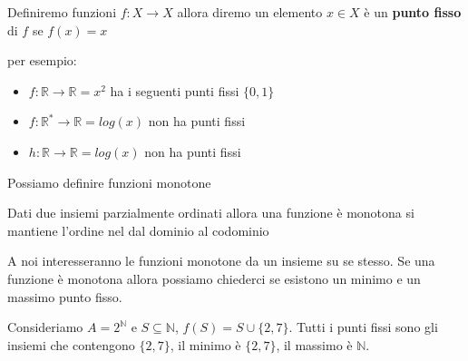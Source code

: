 \begin{definizione}
    Definiremo funzioni $f:X\to X$ allora diremo un elemento $x\in X$ è un \textbf{punto 
    fisso} di $f$ se $f(x)=x$    
\end{definizione}
\begin{esempio}
    per esempio:
    \begin{itemize}
        \item $f:\mathbb{R}\to\mathbb{R}=x^2$ ha i seguenti punti fissi $\{0,1\}$
        \item $f:\mathbb{R}^*\to\mathbb{R}=log(x)$ non ha punti fissi
        \item $h:\mathbb{R}\to\mathbb{R}=log(x)$ non ha punti fissi
    \end{itemize}
\end{esempio}

Possiamo definire funzioni monotone
\begin{definizione}
    Dati due insiemi parzialmente ordinati allora una funzione è monotona
    si mantiene l'ordine nel dal dominio al codominio
\end{definizione}
A noi interesseranno le funzioni monotone da un insieme su se stesso.
Se una funzione è monotona allora possiamo chiederci se esistono un minimo e un 
massimo punto fisso.
\begin{esempio}
    Consideriamo $A = 2^\mathbb{N}$ e $S\subseteq \mathbb{N}$, $f(S)=S\cup \{2,7\}$.
    Tutti i punti fissi sono gli insiemi che contengono $\{2,7\}$, il minimo è
    $\{2,7\}$, il massimo è $\mathbb{N}$.
\end{esempio}

